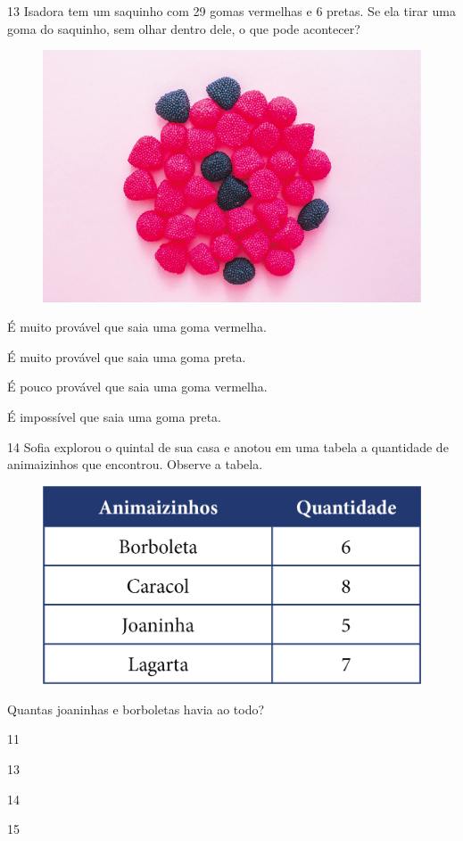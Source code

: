 \num{13} Isadora tem um saquinho com 29 gomas vermelhas e 6 pretas. Se ela tirar
uma goma do saquinho, sem olhar dentro dele, o que pode acontecer?

\begin{figure}[H]
\centering
\includegraphics[width=.6\textwidth]{./media/image132.png}
\end{figure}

\begin{escolha}[itemsep=-5pt]
\item É muito provável que saia uma goma vermelha.

\item É muito provável que saia uma goma preta.

\item É pouco provável que saia uma goma vermelha.

\item É impossível que saia uma goma preta.
\end{escolha}


\num{14} Sofia explorou o quintal de sua casa e anotou em uma tabela a quantidade
de animaizinhos que encontrou. Observe a tabela.

\begin{figure}[H]
\centering
\includegraphics[width=.7\textwidth]{./media/image135.png}
\end{figure}

Quantas joaninhas e borboletas havia ao todo?

\begin{escolha}[itemsep=-5pt]
\item 11

\item 13

\item 14

\item 15
\end{escolha}

